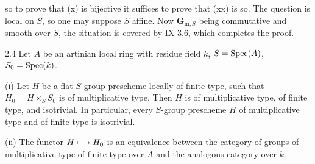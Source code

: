 so to prove that (x) is bijective it suffices to prove that (xx) is so. The question is local on $S$, so one may suppose $S$ affine. Now $\mathbf{G}_{\mathrm{m},S}$ being commutative and smooth over $S$, the situation is covered by IX 3.6, which completes the proof.
\begin{corollary}{2.4}\label{X.2.4}
Let $A$ be an artinian local ring with residue field $k$, $S=\operatorname{Spec}(A)$, $S_0=\operatorname{Spec}(k)$.

(i) Let $H$ be a flat $S$-group prescheme locally of finite type, such that $H_0=H\times_S S_0$ is of multiplicative type. Then $H$ is of multiplicative type, of finite type, and isotrivial. In particular, every $S$-group prescheme $H$ of multiplicative type and of finite type is isotrivial.

(ii) The functor $H\longmapsto H_0$ is an equivalence between the category of groups of multiplicative type of finite type over $A$ and the analogous category over $k$.
\end{corollary}
